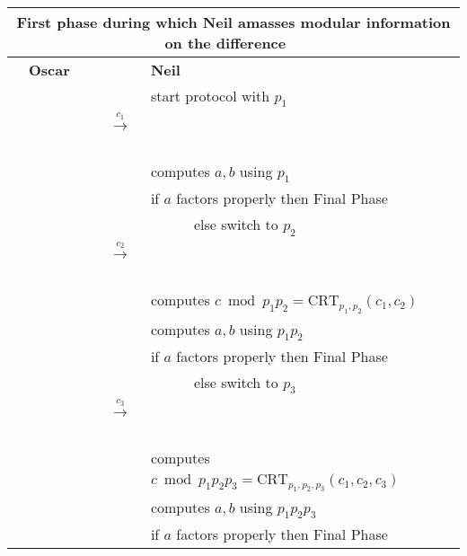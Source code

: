 \documentclass[11pt]{llncs}
\begin{document}
\begin{center}
\begin{tabular}{|lcl|}\hline
\multicolumn{3}{|c|}{{\sf First phase during which Neil amasses modular information on the difference~~}} \\\hline
~~{\bf Oscar}                      &                                                      &   {\bf Neil}~\\
                                   &                                                      &start protocol with $p_1$~\\
                                   &~~{{\LARGE $\stackrel{c_1}{\longrightarrow}$}}~~      &   \\
                                   &                                                      &computes $a,b$ using $p_1$~\\
                                   &                                                      &if $a$ factors properly then {\sf Final Phase}\\
                                   &                                                      &~~~~~~else switch to $p_2$~~\\
                                   &~~{{\LARGE $\stackrel{c_2}{\longrightarrow}$}}~~      &   \\
                                   &                                                      &computes $c \bmod p_1 p_2=\mbox{CRT}_{p_1,p_2}(c_1,c_2)$~~\\
                                   &                                                      &computes $a,b$ using $p_1 p_2$~\\
                                   &                                                      &if $a$ factors properly then {\sf Final Phase}\\
                                   &                                                      &~~~~~~else switch to $p_3$~~\\
                                   &~~{{\LARGE $\stackrel{c_3}{\longrightarrow}$}}~~      &   \\
                                   &                                                      &computes $c \bmod p_1 p_2 p_3=\mbox{CRT}_{p_1,p_2,p_3}(c_1,c_2,c_3)$~~\\
                                   &                                                      &computes $a,b$ using $p_1 p_2 p_3$~\\
                                   &                                                      &if $a$ factors properly then {\sf Final Phase}\\

\end{tabular}
\end{center}
\end{document}
